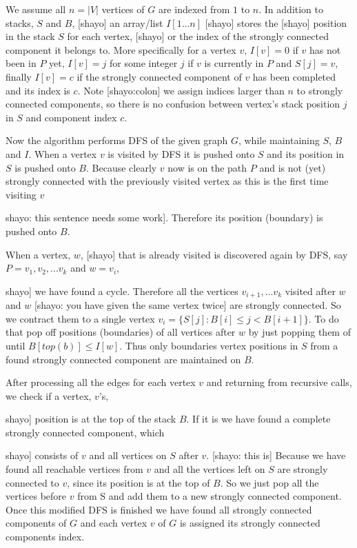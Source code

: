 \documentclass{report}
\theoremstyle{plain}
\theoremstyle{definition}
\theoremstyle{remark}
\numberwithin{definition}{chapter}
\numberwithin{example}{chapter}
\numberwithin{figure}{chapter}
\begin{document}
{{{{{We assume all $n=|V|$ vertices of $G$ are indexed from $1$ to $n$. In addition to stacks, $S$ and $B$, [shayo] an array/list $I[1 \ldots n]$ [shayo] stores the [shayo] position in the stack $S$ for each vertex, [shayo] or the index of the strongly connected component it belongs to.  More specifically for a vertex $v$, $I[v] = 0$ if $v$ has not been in $P$ yet, $I[v]=j$ for some integer $j$ if $v$ is currently in $P$ and $S[j]=v$, finally $I[v]=c$ if the strongly connected component of $v$ has been completed and its index is $c$. Note [shayo:colon] we assign indices larger than $n$ to strongly connected components, so there is no confusion between vertex's stack position $j$ in $S$ and component index $c$.

Now the algorithm performs DFS of the given graph $G$, while maintaining $S$, $B$ and $I$. When a vertex $v$ is visited by DFS it is pushed onto $S$ and its position in $S$ is pushed onto $B$. Because clearly $v$ now is on the path $P$ and is not (yet) strongly connected with the previously visited vertex as this is the first time visiting $v$ {shayo: this sentence needs some work]. Therefore its position (boundary) is pushed onto $B$.

When a vertex, $w$, [shayo] that is already visited is discovered again by DFS, say $P=v_1,v_2,...v_k$ and $w=v_i$, {shayo] we have found a cycle. Therefore all the vertices $v_{i+1},...v_k$ visited after $w$ and $w$ [shayo: you have given the same vertex twice] are strongly connected. So we contract them to a single vertex $v_i=\{ S[j] : B[i] \leq j < B[i+1] \}$. To do that pop off positions (boundaries) of all vertices after $w$ by just popping them of until $B[top(b)] \leq I[w]$. Thus only boundaries vertex positions in $S$ from a found strongly connected component are maintained on $B$.

After processing all the edges for each vertex $v$ and returning from recursive calls, we check if a vertex, $v$'s, {shayo] position is at the top of the stack $B$. If it is we have found a complete strongly connected component, which {shayo] consists of $v$ and all vertices on $S$ after $v$. [shayo: this is] Because we have found all reachable vertices from $v$ and all the vertices left on $S$ are strongly connected to $v$, since its position is at the top of $B$. So we just pop all the vertices before $v$ from S and add them to a new strongly connected component. Once this modified DFS is finished we have found all strongly connected components of $G$ and each vertex $v$ of $G$ is assigned its strongly connected components index.

}}}}}}}}}
\end{document}
